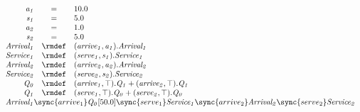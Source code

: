 \begin{displaymath}
	\begin{array}{rcl}
		\mathit{a_1} & = & 10.0\\
		\mathit{s_1} & = & 5.0\\
		\mathit{a_2} & = & 1.0\\
		\mathit{s_2} & = & 5.0\\
[0.0ex]		\mathit{Arrival_1} & \rmdef & (\mathit{arrive_1},\mathit{a_1}).\mathit{Arrival_1}\\
		\mathit{Service_1} & \rmdef & (\mathit{serve_1},\mathit{s_1}).\mathit{Service_1}\\
		\mathit{Arrival_2} & \rmdef & (\mathit{arrive_2},\mathit{a_2}).\mathit{Arrival_2}\\
		\mathit{Service_2} & \rmdef & (\mathit{serve_2},\mathit{s_2}).\mathit{Service_2}\\
		\mathit{Q_0} & \rmdef & (\mathit{arrive_1},\top).\mathit{Q_1}+(\mathit{arrive_2},\top).\mathit{Q_1}\\
		\mathit{Q_1} & \rmdef & (\mathit{serve_1},\top).\mathit{Q_0}+(\mathit{serve_2},\top).\mathit{Q_0}\\
[0.0ex]		\multicolumn{3}{l}{\mathit{Arrival_1}\sync{arrive_1}\mathit{Q_0}[50.0]\sync{serve_1}\mathit{Service_1}\sync{arrive_2}\mathit{Arrival_2}\sync{serve_2}\mathit{Service_2}}\\
[0.0ex]	\end{array}
\end{displaymath}
